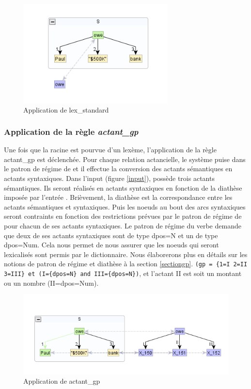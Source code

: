 \begin{figure}[htb]
	\centering
	\includegraphics[width=0.7\textwidth, trim = {0cm 0cm 0cm 0cm},clip]{ch3/figs/lex_standard_root.png}
		\vspace{-0.5cm}
	\caption{Application de lex\_standard}
	\label{fig:lexstand1}
\end{figure}

\subsubsection{Application de la règle \emph{actant\_gp}}
Une fois que la racine est pourvue d'un lexème, l'application de la règle actant\_gp est déclenchée. Pour chaque relation actancielle, le système puise dans le patron de régime de  et il effectue la conversion des actants sémantiques en actants syntaxiques. Dans l'input (figure \ref{input}),  possède trois actants sémantiques. Ils seront réalisés en actants syntaxiques en fonction de la diathèse imposée par l'entrée . Brièvement, la diathèse est la correspondance entre les actants sémantiques et syntaxiques. Puis les noeuds au bout des arcs syntaxiques seront contraints en fonction des restrictions prévues par le patron de régime de  pour chacun de ses actants syntaxiques. Le patron de régime du verbe demande que deux de ses actants syntaxiques sont de type dpos=N et un de type dpos=Num. Cela nous permet de nous assurer que les noeuds qui seront lexicalisés sont permis par le dictionnaire. Nous élaborerons plus en détails sur les notions de patron de régime et diathèse à la section \ref{sectiongp}. \lstinline!(gp = {1=I 2=II 3=III} et (I={dpos=N} and III={dpos=N})!, et l'actant II est soit un montant ou un nombre (II={dpos=Num}).
\begin{figure}[htb]
	\centering
	\includegraphics[width=1\textwidth, trim = {0cm 0cm 0cm 0cm},clip]{ch3/figs/actant_gp1.png}
	\caption{Application de actant\_gp}
	\label{fig:actantgp}
\end{figure}

